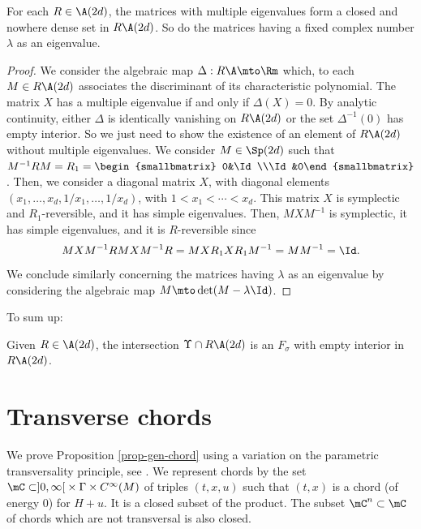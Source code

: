 \begin{prop}\label{prop-gen}
For each $R\in \A(2d)$, the matrices with multiple eigenvalues form a closed and nowhere dense set in $R\A(2d)$. So do the matrices having a fixed complex number $\lambda$ as an eigenvalue.
\end{prop}

\begin{proof}
We consider the algebraic map $\Delta: R\A\mto \Rm$ which, to each $M\in R\A(2d)$ associates the discriminant of its characteristic polynomial. The matrix $X$ has a multiple eigenvalue if and only if $\Delta(X)=0$.
By analytic continuity, either $\Delta$ is identically vanishing on $R\A(2d)$ or the set $\Delta^{-1}(0)$ has empty interior.
So we just need to show the existence of an element of $R\A(2d)$ without multiple eigenvalues.
We consider $M\in \Sp(2d)$ such that
$M^{-1}RM=R_1=
\begin{smallbmatrix} 0&\Id\\\Id&0\end{smallbmatrix}
$.
Then, we consider a diagonal matrix $X$, with diagonal elements $(x_1, \ldots, x_d, 1/x_1, \ldots, 1/x_d)$,
with $1<x_1< \cdots <x_d$. This matrix $X$ is symplectic and $R_1$-reversible, and it has simple eigenvalues.
Then, $MXM^{-1}$ is symplectic, it has simple eigenvalues, and it is $R$-reversible since
\[
MXM^{-1}RMXM^{-1}R=MXR_1XR_1M^{-1}=MM^{-1}=\Id.
\]
We conclude similarly concerning the matrices having $\lambda$ as an eigenvalue by considering the algebraic map $M\mto \det (M-\lambda \Id)$.
\end{proof}

To sum up:

\begin{cor} \label{cor-RA}
Given $R\in \A(2d)$, the intersection $\Upsilon\cap R\A(2d)$ is an $F_{\sigma}$ with empty interior in $R\A(2d)$.
\end{cor}

\section{Transverse chords}\label{sec-tc}
We prove Proposition \ref{prop-gen-chord} using a variation on the parametric transversality principle, see \cite{A63}.
We represent chords by the set $\mC\subset ]0,\infty[{}\times \Gamma\times C^{\infty}(M)$ of triples $(t,x,u)$
such that $(t,x)$ is a chord (of energy $0$) for $H+u$. It is a closed subset of the product. The subset $\mC^n\subset\mC$ of chords which are not transversal is also closed.

